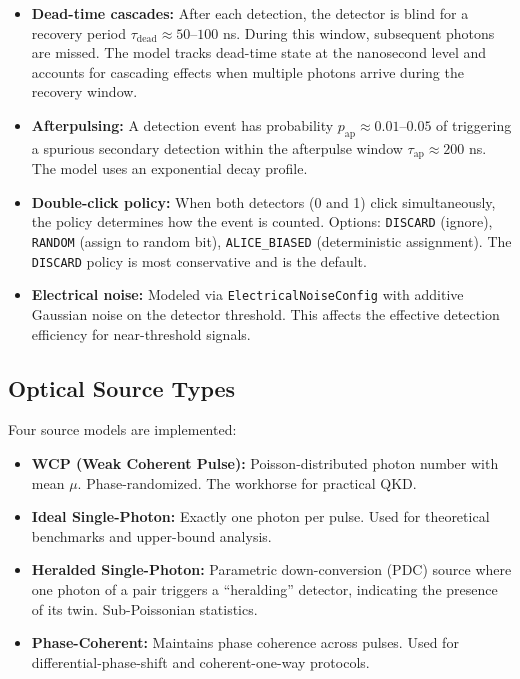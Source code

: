 \documentclass[11pt,a4paper,oneside]{report}
\begin{document}
\begin{itemize}
\item \textbf{Dead-time cascades:} After each detection, the detector is blind for a recovery period $\tau_{\text{dead}} \approx 50$–$100$ ns. During this window, subsequent photons are missed. The model tracks dead-time state at the nanosecond level and accounts for cascading effects when multiple photons arrive during the recovery window.
\item \textbf{Afterpulsing:} A detection event has probability $p_{\text{ap}} \approx 0.01$–$0.05$ of triggering a spurious secondary detection within the afterpulse window $\tau_{\text{ap}} \approx 200$ ns. The model uses an exponential decay profile.
\item \textbf{Double-click policy:} When both detectors (0 and 1) click simultaneously, the policy determines how the event is counted. Options: \texttt{DISCARD} (ignore), \texttt{RANDOM} (assign to random bit), \texttt{ALICE\_BIASED} (deterministic assignment). The \texttt{DISCARD} policy is most conservative and is the default.
\item \textbf{Electrical noise:} Modeled via \texttt{ElectricalNoiseConfig} with additive Gaussian noise on the detector threshold. This affects the effective detection efficiency for near-threshold signals.
\end{itemize}

\subsection{Optical Source Types}

Four source models are implemented:

\begin{itemize}
\item \textbf{WCP (Weak Coherent Pulse):} Poisson-distributed photon number with mean $\mu$. Phase-randomized. The workhorse for practical QKD.
\item \textbf{Ideal Single-Photon:} Exactly one photon per pulse. Used for theoretical benchmarks and upper-bound analysis.
\item \textbf{Heralded Single-Photon:} Parametric down-conversion (PDC) source where one photon of a pair triggers a ``heralding'' detector, indicating the presence of its twin. Sub-Poissonian statistics.
\item \textbf{Phase-Coherent:} Maintains phase coherence across pulses. Used for differential-phase-shift and coherent-one-way protocols.
\end{itemize}
\end{document}
